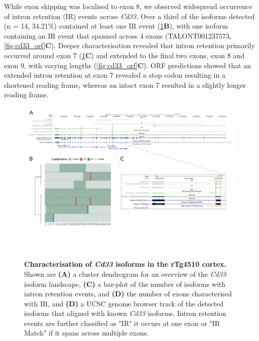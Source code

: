 While exon skipping was localised to exon 8, we observed widespread occurrence of intron retention (IR) events across \textit{Cd33}. Over a third of the isoforms detected (n = 14, 34.21\%) contained at least one IR event (\cref{fig:cd33}\textbf{B}), with one isoform containing an IR event that spanned across 4 exons (TALONT001237573, \cref{fig:cd33_orf}\textbf{C}). Deeper characterisation revealed that intron retention primarily occurred around exon 7 (\cref{fig:cd33}\textbf{C}) and extended to the final two exons, exon 8 and exon 9, with varying lengths (\cref{fig:cd33_orf}\textbf{C}). ORF predictions showed that an extended intron retention at exon 7 revealed a stop codon resulting in a shortened reading frame, whereas an intact exon 7 resulted in a slightly longer reading frame.

\begin{landscape}
	\begin{figure}[htp]
		\centering
		\captionsetup{width=1.3\textwidth}
		\includegraphics[page=4,trim={0 3cm 0 0},scale = 0.85]{Figures/TargetGenes_Annotation_Landscape.pdf}
		\caption[Characterisation of the \textit{Cd33} isoform landscape]%
		{\textbf{Characterisation of \textit{Cd33} isoforms in the rTg4510 cortex.} Shown are \textbf{(A)} a cluster dendrogram for an overview of the \textit{Cd33} isoform landscape, \textbf{(C)} a bar-plot of the number of isoforms with intron retention events, and \textbf{(D)} the number of exons characterised with IR, and \textbf{(D)} a UCSC genome browser track of the detected isoforms that aligned with known \textit{Cd33} isoforms. Intron retention events are further classified as "IR" it occurs at one exon or "IR Match" if it spans across multiple exons.}    
		\label{fig:cd33}
	\end{figure}
\end{landscape}

